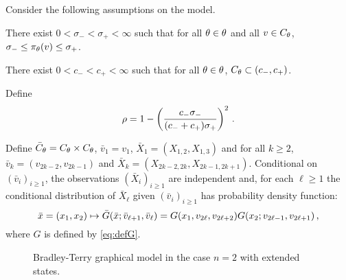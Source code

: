 Consider the following assumptions on the model.

\begin{hypH}
\label{assum:strongmix}
There exist $0<\sigma_-<\sigma_+<\infty$ such that for all $\theta\in\theta$ and all $v\in C_{\theta}$, $\sigma_-\le \pi_{\theta}(v)\le\sigma_+$.
\end{hypH}

\begin{hypH}
\label{assum:compact}
There exist $0<c_-<c_+<\infty$ such that for all $\theta\in\theta$, $C_{\theta} \subset (c_-,c_+)$.
\end{hypH}

Define 
\begin{equation}
\label{eq:def:rho}
\rho = 1- \left(\frac{c_-\sigma_-}{(c_-+c_+)\sigma_+}\right)^2\,.
\end{equation}

Define $\bar C_{\theta} = C_{\theta}\times C_{\theta}$, $\bar v_1 = v_1$, $\bar X_1 = (X_{1,2},X_{1,3})$ and for all $k\ge 2$, $\bar v_k = (v_{2k-2},v_{2k-1})$ and $\bar X_k = (X_{2k-2,2k},X_{2k-1,2k+1})$. Conditional on $(\bar v_i)_{i\ge 1}$, the observations $(\bar X_i)_{i\ge 1}$ are independent and, for each $\ell\ge 1$ the conditional distribution of $\bar X_{\ell}$ given $(\bar v_i)_{i\ge 1}$ has probability density function:
\[
\bar x = (x_1,x_2) \mapsto \bar G (\bar x;\bar v_{\ell+1},\bar v_{\ell}) = G (x_1,v_{2\ell},v_{2\ell+2})G (x_2;v_{2\ell-1},v_{2\ell+1})\,,
\]
where $G$ is defined by \eqref{eq:defG}.
\begin{figure}
\label{fig:bt:extended}
\centering
{}
\caption{Bradley-Terry graphical model in the case $n=2$ with extended states.}
\end{figure}

